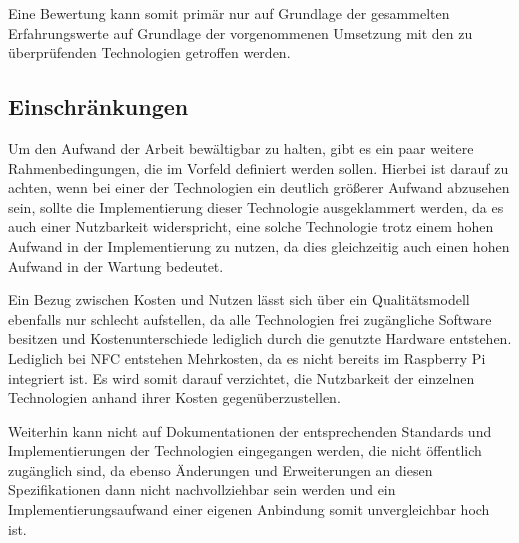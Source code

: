 		Eine Bewertung kann somit primär nur auf Grundlage der gesammelten Erfahrungswerte auf Grundlage der vorgenommenen Umsetzung mit den zu \linebreak überprüfenden Technologien getroffen werden. 
		
		\subsection{Einschränkungen}
		Um den Aufwand der Arbeit bewältigbar zu halten, gibt es ein paar weitere Rahmenbedingungen, die im Vorfeld definiert werden sollen. Hierbei ist darauf zu achten, wenn bei einer der Technologien ein deutlich größerer Aufwand abzusehen sein, sollte die Implementierung dieser Technologie ausgeklammert werden, da es auch einer Nutzbarkeit widerspricht, eine solche Technologie trotz einem hohen Aufwand in der Implementierung zu nutzen, da dies gleichzeitig auch einen hohen Aufwand in der Wartung bedeutet.
		
		Ein Bezug zwischen Kosten und Nutzen lässt sich über ein Qualitätsmodell ebenfalls nur schlecht aufstellen, da alle Technologien frei zugängliche Software besitzen und Kostenunterschiede lediglich durch die genutzte Hardware entstehen. Lediglich bei NFC entstehen Mehrkosten, da es nicht bereits im Raspberry Pi integriert ist. Es wird somit darauf verzichtet, die Nutzbarkeit der einzelnen Technologien anhand ihrer Kosten gegenüberzustellen.
		
		Weiterhin kann nicht auf Dokumentationen der entsprechenden Standards und Implementierungen der Technologien eingegangen werden, die nicht öffentlich \linebreak zugänglich sind, da ebenso Änderungen und Erweiterungen an diesen Spezifikationen dann nicht nachvollziehbar sein werden und ein Implementierungsaufwand einer eigenen Anbindung somit unvergleichbar hoch ist.
		
		
